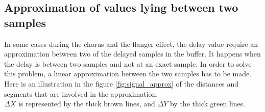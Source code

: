 \subsection{Approximation of values lying between two samples}\label{flang_approx_subsec}

In some cases during the chorus and the flanger effect, the delay value require an approximation between two of the delayed samples in the buffer. It happens when the delay is between two samples and not at an exact sample. In order to solve this problem, a linear approximation between the two samples has to be made. \\

Here is an illustration in the figure \ref{fig:signal_approx} of the distances and segments that are involved in the approximation. \\
$\Delta X$ is represented by the thick brown lines, and $\Delta Y$ by the thick green lines. 


